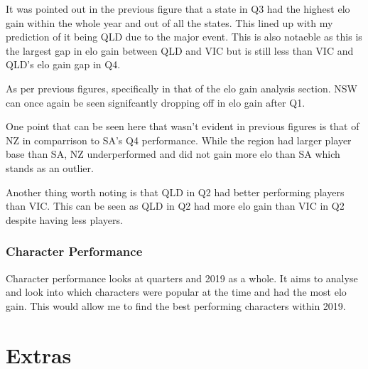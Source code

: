 \documentclass[11pt, oneside, a4paper]{article}
\begin{document}
It was pointed out in the previous figure that a state in Q3 had the highest elo gain within the whole year and out of all the states. This lined up with my prediction of it being QLD due to the major event. This is also notaeble as this is the largest gap in elo gain between QLD and VIC but is still less than VIC and QLD's elo gain gap in Q4.

As per previous figures, specifically in that of the elo gain analysis section. NSW can once again be seen signifcantly dropping off in elo gain after Q1. 

One point that can be seen here that wasn't evident in previous figures is that of NZ in comparrison to SA's Q4 performance. While the region had larger player base than SA, NZ underperformed and did not gain more elo than SA which stands as an outlier. 

Another thing worth noting is that QLD in Q2 had better performing players than VIC. This can be seen as QLD in Q2 had more elo gain than VIC in Q2 despite having less players.

\newpage
\subsubsection{Character Performance}
Character performance looks at quarters and 2019 as a whole. It aims to analyse and look into which characters were popular at the time and had the most elo gain. This would allow me to find the best performing characters within 2019.

\section{Extras}
\end{document}
